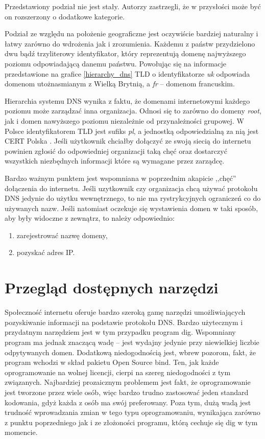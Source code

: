 Przedstawiony podział nie jest stały. Autorzy zastrzegli, że w przysłości może być on rozszerzony o dodatkowe kategorie.

Podział ze względu na położenie geograficzne jest oczywiście bardziej naturalny i łatwy zarówno do wdrożenia jak i zrozumienia. Każdemu z państw przydzielono dwu bądź trzyliterowy identyfikator, który reprezentują domenę najwyższego poziomu odpowiadającą danemu państwu. Powołując się na informacje przedstawione na grafice \ref{hierarchy_dns} TLD o identyfikatorze \textit{uk} odpowiada domenom utożnasmianym z Wielką Brytnią, a \textit{fr} -- domenom francuskim.

Hierarchia systemu DNS wynika z faktu, że domenami internetowymi każdego poziomu może zarządzać inna organizacja. Odnosi się to zarówno do domeny \textit{root}, jak i domen nawyższego poziomu niezależnie od przynależności grupowej. W Polsce identyfikatorem TLD jest sufiks \textit{pl}, a jednostką odpowiedzialną za nią jest CERT Polska \cite{cert}. Jeśli użytkownik chciałby dołączyć ze swoją siecią do internetu powinien zgłosić do odpowiedniej organizacji taką chęć oraz dostarczyć wszystkich niezbędnych informacji które są wymagane przez zarządcę. 

Bardzo ważnym punktem jest wspomniana w poprzednim akapicie ,,chęć'' dołączenia do internetu. Jeśli uzytkownik czy organizacja chcą używać protokołu DNS jedynie do użytku wewnętrznego, to nie ma rystrykcyjnych ograniczeń co do używanych nazw. Jeśli natomiast oczekuje się wystawienia domen w taki sposób, aby były widoczne z zewnątrz, to należy odpowiednio:
\begin{enumerate}
	\item zarejestrować nazwę domeny,
	\item pozyskać adres IP.
\end{enumerate}


\chapter{Przegląd dostępnych narzędzi}
Społeczność internetu oferuje bardzo szeroką gamę narzędzi umożliwiających pozyskiwanie informacji na podstawie protokołu DNS. Bardzo użytecznym i przydatnym narzędziem jest w tym przypadku program dig. Wspomniany program ma jednak znaczącą wadę -- jest wydajny jedynie przy niewielkiej liczbie odpytywanych domen. Dodatkową niedogodnością jest, wbrew pozorom, fakt, że program wchodzi w skład pakietu Open Source bind. Ten, jak każde oprogramowanie na wolnej licencji, cierpi na szereg niedogodności z tym związanych. Najbardziej prozaicznym problemem jest fakt, że oprogramowanie jest tworzone przez wiele osób, więc bardzo trudno zastosować jeden standard kodowania, gdyż każda z osób ma swój preferowany. Poza tym, dużą wadą jest trudność wprowadzania zmian w tego typu oprogramowaniu, wynikająca zarówno z punktu poprzedniego jak i ze złożoności programu, którą cechuje się dig w tym momencie.

